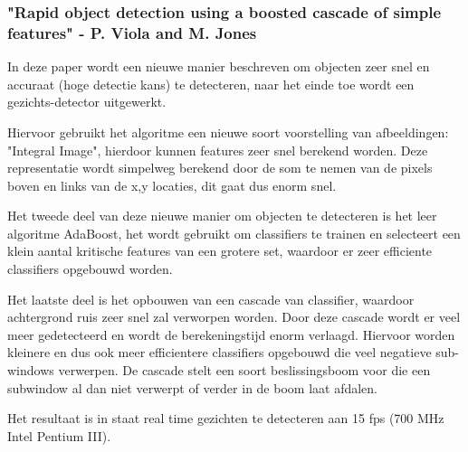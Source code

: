 \documentclass[]{article}
\begin{document}
\subsubsection*{"Rapid object detection using a boosted cascade of simple features" - P. Viola and M. Jones}
In deze paper wordt een nieuwe manier beschreven om objecten zeer snel en accuraat (hoge detectie kans) te detecteren, naar het einde toe wordt een gezichts-detector uitgewerkt.
\par
Hiervoor gebruikt het algoritme een nieuwe soort voorstelling van afbeeldingen: "Integral Image", hierdoor kunnen features zeer snel berekend worden. Deze representatie wordt simpelweg berekend door de som te nemen van de pixels boven en links van de x,y locaties, dit gaat dus enorm snel.
\par
Het tweede deel van deze nieuwe manier om objecten te detecteren is het leer algoritme AdaBoost, het wordt gebruikt om classifiers te trainen en selecteert een klein aantal kritische features van een grotere set, waardoor er zeer efficiente classifiers opgebouwd worden.
\par
Het laatste deel is het opbouwen van een cascade van classifier, waardoor achtergrond ruis zeer snel zal verworpen worden. Door deze cascade wordt er veel meer gedetecteerd en wordt de berekeningstijd enorm verlaagd. Hiervoor worden kleinere en dus ook meer efficientere classifiers opgebouwd die veel negatieve sub-windows verwerpen. De cascade stelt een soort beslissingsboom voor die een subwindow al dan niet verwerpt of verder in de boom laat afdalen.
\par
Het resultaat is in staat real time gezichten te detecteren aan 15 fps (700 MHz Intel Pentium III).
\end{document}
